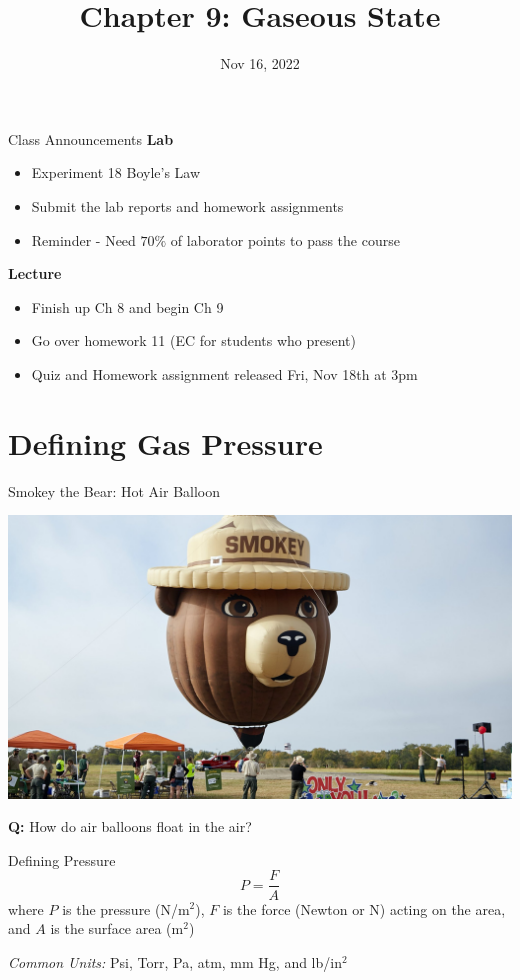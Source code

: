 \documentclass[11pt]{beamer}
\title{Chapter 9: Gaseous State}
\institute{Chemistry Department, Cypress College}
\date{Nov 16, 2022}
\begin{document}
\begin{frame}
  \titlepage
\end{frame}

\begin{frame}{Class Announcements}
  \textbf{Lab}
  \begin{itemize}
  \item Experiment 18 Boyle's Law
  \item Submit the lab reports and homework assignments
  \item Reminder - Need $70\%$ of laborator points to pass
    the course
  \end{itemize}

  \textbf{Lecture}
  \begin{itemize}
  \item Finish up Ch 8 and begin Ch 9
  \item Go over homework 11 (EC for students who present)
  \item Quiz and Homework assignment released Fri, Nov 18th at 3pm
  \end{itemize}
\end{frame}

\section{Defining Gas Pressure}

\begin{frame}{Smokey the Bear: Hot Air Balloon}
  \begin{center}
    \includegraphics[scale=0.2]{smokey_air}
  \end{center}
  \textbf{Q:} How do air balloons float in the air?
\end{frame}

\begin{frame}{Defining Pressure}
  \begin{equation}
    P = \frac{F}{A}
  \end{equation}
  where $P$ is the pressure (N/m$^2$), $F$ is the force (Newton or N) acting on the area,
  and $A$ is the surface area (m$^2$)

  \textit{Common Units:} Psi, Torr, Pa, atm, mm Hg, and lb/in$^2$
\end{frame}
\end{document}
